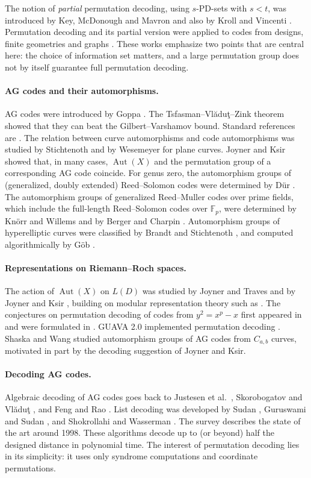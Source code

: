 \documentclass[12pt,letterpaper]{article}
\theoremstyle{definition}
\theoremstyle{remark}
\numberwithin{equation}{section}
\newcommand{\F}{\mathbb{F}}
\newcommand{\Aut}{\operatorname{Aut}}
\begin{document}
The notion of \emph{partial} permutation decoding, using $s$-PD-sets with
$s<t$, was introduced by Key, McDonough and Mavron \cite{KMM05} and
also by Kroll and Vincenti \cite{KV05}.  Permutation decoding and its
partial version were applied to codes from designs, finite geometries and
graphs \cite{KMR04,KMM06,KS07}.  These works emphasize two points that are
central here: the choice of information set matters, and a large
permutation group does not by itself guarantee full permutation decoding.

\paragraph{AG codes and their automorphisms.}
AG codes were introduced by Goppa \cite{Go81}.  The Tsfasman--Vl\u{a}du\c{t}--Zink
theorem \cite{TVZ82} showed that they can beat the Gilbert--Varshamov
bound.  Standard references are \cite{St93,TV91,HvLP98}.  The relation between
curve automorphisms and code automorphisms was studied by Stichtenoth
\cite{St90} and by Wesemeyer \cite{We98} for plane curves.  Joyner and Ksir
\cite{JK06} showed that, in many cases, $\Aut(X)$ and the permutation
group of a corresponding AG code coincide.  For genus zero, the
automorphism groups of (generalized, doubly extended) Reed--Solomon codes
were determined by D\"ur \cite{Du87}.  The automorphism groups of
generalized Reed--Muller codes over prime fields, which include the
full-length Reed--Solomon codes over $\F_p$, were determined by Kn\"orr and
Willems \cite{KW90} and by Berger and Charpin \cite{BC93}.  Automorphism
groups of hyperelliptic curves were classified by Brandt and Stichtenoth
\cite{BrS86}, and computed algorithmically by G\"ob \cite{Go03}.

\paragraph{Representations on Riemann--Roch spaces.}
The action of $\Aut(X)$ on $L(D)$ was studied by Joyner and Traves
\cite{JT02} and by Joyner and Ksir \cite{JK03}, building on modular
representation theory such as \cite{Sc90}.  The conjectures on permutation
decoding of codes from $y^2=x^p-x$ first appeared in \cite{JT02} and were
formulated in \cite{Jo05}.  GUAVA 2.0 implemented permutation decoding
\cite{GUAVA}.  Shaska and Wang \cite{ShW07} studied automorphism groups of
AG codes from $C_{a,b}$ curves, motivated in part by the decoding
suggestion of Joyner and Ksir.

\paragraph{Decoding AG codes.}
Algebraic decoding of AG codes goes back to Justesen et al.\
\cite{JLJHH89}, Skorobogatov and Vl\u{a}du\c{t} \cite{SV90}, and Feng and
Rao \cite{FR93}.  List decoding was developed by Sudan \cite{Su97},
Guruswami and Sudan \cite{GS99}, and Shokrollahi and Wasserman
\cite{SW99}.  The survey \cite{HvLP98} describes the state of the art around
1998.  These algorithms decode up to (or beyond) half the designed
distance in polynomial time.  The interest of permutation decoding lies
in its simplicity: it uses only syndrome computations and coordinate
permutations.
\end{document}
